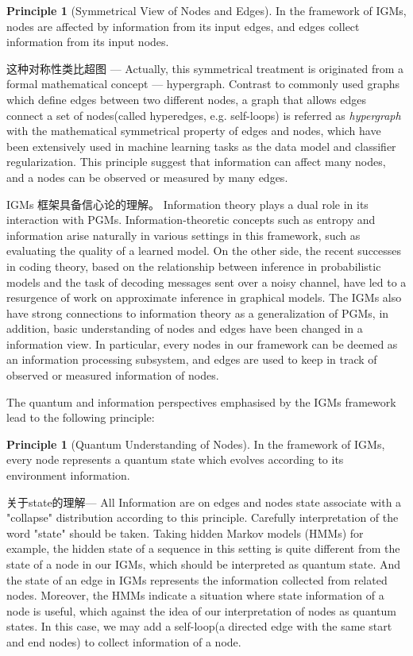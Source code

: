 \documentclass{article}
\theoremstyle{definition}
\theoremstyle{remark}
\theoremstyle{definition}
\newtheorem{principle}[theorem]{Principle}
\begin{document}
\begin{CJK*}{UTF8}{gbsn}
\begin{principle}[Symmetrical View of Nodes and Edges]
\label{prin:sym}
In the framework of IGMs, nodes are affected by information from its input edges, and edges collect information from its input nodes.
\end{principle}

这种对称性类比超图 ---
Actually, this symmetrical treatment is originated from a formal mathematical concept --- hypergraph. Contrast to commonly used graphs which define edges between two different nodes, a graph that allows edges connect a set of nodes(called hyperedges, e.g. self-loops) is referred as \emph{hypergraph} with the mathematical symmetrical property of edges and nodes, which have been extensively used in machine learning tasks as the data model and classifier regularization\cite{zhou2007learning}. This principle suggest that information can affect many nodes, and a nodes can be observed or measured by many edges. 

IGMs 框架具备信心论的理解。
 Information theory plays a dual role in its interaction with PGMs. Information-theoretic concepts such as entropy and information arise naturally in various settings in this framework, such as evaluating the quality of a learned model. On the other side, the recent successes in coding theory, based on the relationship between inference in probabilistic models and the task of decoding messages sent over a noisy channel, have led to a resurgence of work on approximate inference in graphical models. The IGMs also have strong connections to information theory as a generalization of PGMs, in addition, basic understanding of nodes and edges have been changed in a information view. In particular, every nodes in our framework can be deemed as an information processing subsystem, and edges are used to keep in track of observed or measured information of nodes. 

The quantum and information perspectives emphasised by the IGMs framework lead to the following principle:

\begin{principle}[Quantum Understanding of Nodes]
\label{prin:quantum}
In the framework of IGMs, every node represents a quantum state which evolves according to its environment information.
\end{principle}

关于state的理解--- All Information are on edges and nodes state associate with a "collapse" distribution according to this principle. Carefully interpretation of the word "state" should be taken. Taking hidden Markov models (HMMs) for example, the hidden state of a sequence in this setting is quite different from the state of a node in our IGMs, which should be interpreted as quantum state. And the state of an edge in IGMs represents the information collected from related nodes. Moreover, the HMMs indicate a situation where state information of a node is useful, which against the idea of our interpretation of nodes as quantum states. In this case, we may add a self-loop(a directed edge with the same start and end nodes) to collect information of a node. 


\end{CJK*}
\end{document}
